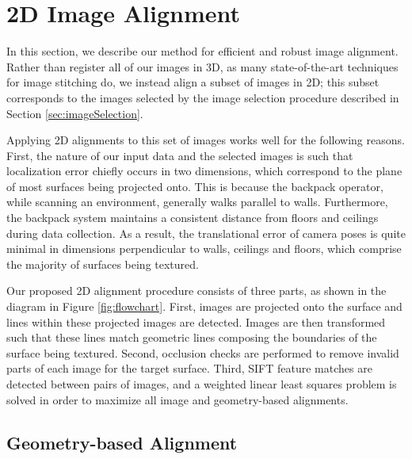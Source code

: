 \documentclass[]{spie}  %
\begin{document}
\section{2D Image Alignment}
\label{sec:2dAlignment}
In this section, we describe our method for efficient and robust image
alignment. Rather than register all of our images in 3D, as many
state-of-the-art techniques for image stitching do, we instead align a
subset of images in 2D; this subset corresponds to the images selected
by the image selection procedure described in Section
\ref{sec:imageSelection}.

Applying 2D alignments to this set of images works well for the
following reasons. First, the nature of our input data and the
selected images is such that localization error chiefly occurs in two
dimensions, which correspond to the plane of most surfaces being
projected onto. This is because the backpack operator, while scanning
an environment, generally walks parallel to walls. Furthermore, the
backpack system maintains a consistent distance from floors and
ceilings during data collection. As a result, the translational error
of camera poses is quite minimal in dimensions perpendicular to walls,
ceilings and floors, which comprise the majority of surfaces being
textured.

Our proposed 2D alignment procedure consists of three parts, as shown
in the diagram in Figure \ref{fig:flowchart}. First, images are
projected onto the surface and lines within these projected images are
detected. Images are then transformed such that these lines match
geometric lines composing the boundaries of the surface being
textured. Second, occlusion checks are performed to remove invalid
parts of each image for the target surface. Third, SIFT feature
matches are detected between pairs of images, and a weighted linear
least squares problem is solved in order to maximize all image and
geometry-based alignments.


\subsection{Geometry-based Alignment}
\label{sec:geometryAlignment}
\end{document}
